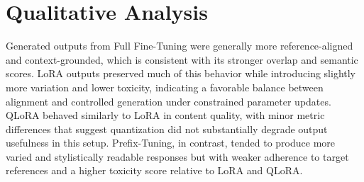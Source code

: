 \documentclass[11pt]{article}
\begin{document}
\section{Qualitative Analysis}
Generated outputs from Full Fine-Tuning were generally more reference-aligned and context-grounded, which is consistent with its stronger overlap and semantic scores. LoRA outputs preserved much of this behavior while introducing slightly more variation and lower toxicity, indicating a favorable balance between alignment and controlled generation under constrained parameter updates. QLoRA behaved similarly to LoRA in content quality, with minor metric differences that suggest quantization did not substantially degrade output usefulness in this setup. Prefix-Tuning, in contrast, tended to produce more varied and stylistically readable responses but with weaker adherence to target references and a higher toxicity score relative to LoRA and QLoRA.
\end{document}
